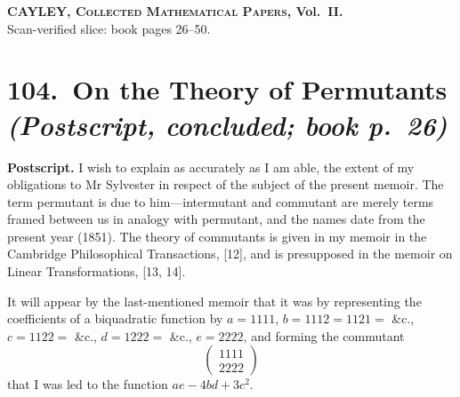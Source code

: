 \documentclass[11pt,a4paper]{article}
\theoremstyle{plain}
\begin{document}

\begin{center}
{\large\bfseries CAYLEY, \textsc{Collected Mathematical Papers}, Vol.\ II.}\\[0.3em]
{\small Scan-verified slice: book pages 26--50.}
\end{center}
\bigskip

\section*{104.\ On the Theory of Permutants \emph{(Postscript, concluded; book p.\ 26)}}

\noindent\textbf{Postscript.}\quad
I wish to explain as accurately as I am able, the extent of my obligations to Mr Sylvester in respect of the subject of the present memoir. The term permutant is due to him---intermutant and commutant are merely terms framed between us in analogy with permutant, and the names date from the present year (1851). The theory of commutants is given in my memoir in the Cambridge Philosophical Transactions, [12], and is presupposed in the memoir on Linear Transformations, [13, 14].

It will appear by the last-mentioned memoir that it was by representing the coefficients of a biquadratic function by $a = 1111$, $b = 1112 = 1121 =$ \&c., $c = 1122 =$ \&c., $d = 1222 =$ \&c., $e = 2222$, and forming the commutant
\[\begin{pmatrix} 1111 \\ 2222 \end{pmatrix}\]
that I was led to the function $ae - 4bd + 3c^2$.
\end{document}
